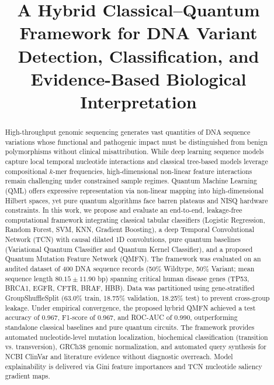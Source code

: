 \documentclass[conference]{IEEEtran}
\begin{document}
\title{A Hybrid Classical--Quantum Framework for DNA Variant Detection, Classification, and Evidence-Based Biological Interpretation}

\author{
}

\maketitle

\begin{abstract}
High-throughput genomic sequencing generates vast quantities of DNA sequence variations whose functional and pathogenic impact must be distinguished from benign polymorphisms without clinical misattribution. While deep learning sequence models capture local temporal nucleotide interactions and classical tree-based models leverage compositional $k$-mer frequencies, high-dimensional non-linear feature interactions remain challenging under constrained sample regimes. Quantum Machine Learning (QML) offers expressive representation via non-linear mapping into high-dimensional Hilbert spaces, yet pure quantum algorithms face barren plateaus and NISQ hardware constraints. 
In this work, we propose and evaluate an end-to-end, leakage-free computational framework integrating classical tabular classifiers (Logistic Regression, Random Forest, SVM, KNN, Gradient Boosting), a deep Temporal Convolutional Network (TCN) with causal dilated 1D convolutions, pure quantum baselines (Variational Quantum Classifier and Quantum Kernel Classifier), and a proposed Quantum Mutation Feature Network (QMFN). The framework was evaluated on an audited dataset of 400 DNA sequence records (50\% Wildtype, 50\% Variant; mean sequence length $80.15 \pm 11.90$ bp) spanning critical human disease genes (TP53, BRCA1, EGFR, CFTR, BRAF, HBB). Data was partitioned using gene-stratified GroupShuffleSplit (63.0\% train, 18.75\% validation, 18.25\% test) to prevent cross-group leakage. 
Under empirical convergence, the proposed hybrid QMFN achieved a test accuracy of 0.967, F1-score of 0.967, and ROC-AUC of 0.990, outperforming standalone classical baselines and pure quantum circuits. The framework provides automated nucleotide-level mutation localization, biochemical classification (transition vs. transversion), GRCh38 genomic normalization, and automated query synthesis for NCBI ClinVar and literature evidence without diagnostic overreach. Model explainability is delivered via Gini feature importances and TCN nucleotide saliency gradient maps.
\end{abstract}
\end{document}

